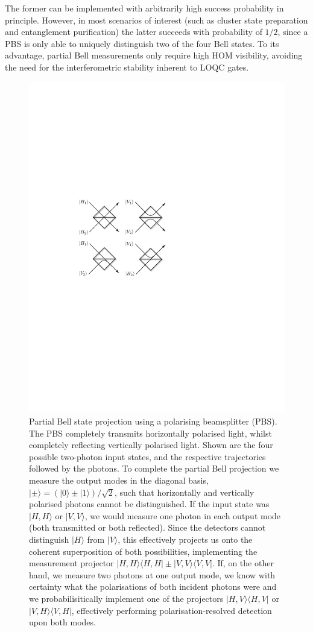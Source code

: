 \documentclass[aps,rmp,twocolumn,amsmath,amssymb,nofootinbib,superscriptaddress,longbibliography,floatfix]{revtex4-1}
\newcommand{\bra}[1]{\langle#1|}
\newcommand{\ket}[1]{|#1\rangle}
\begin{document}
The former can be implemented with arbitrarily high success probability in principle. However, in most scenarios of interest (such as cluster state preparation and entanglement purification) the latter succeeds with probability of $1/2$, since a PBS is only able to uniquely distinguish two of the four Bell states. To its advantage, partial Bell measurements only require high HOM visibility, avoiding the need for the interferometric stability inherent to LOQC gates.

\begin{figure}[!htb]
\includegraphics[width=0.75\columnwidth]{partial_bell}
\caption{Partial Bell state projection using a polarising beamsplitter (PBS). The PBS completely transmits horizontally polarised light, whilst completely reflecting vertically polarised light. Shown are the four possible two-photon input states, and the respective trajectories followed by the photons. To complete the partial Bell projection we measure the output modes in the diagonal basis, \mbox{$\ket{\pm} = (\ket{0}\pm\ket{1})/\sqrt{2}$}, such that horizontally and vertically polarised photons cannot be distinguished. If the input state was $\ket{H,H}$ or $\ket{V,V}$, we would measure one photon in each output mode (both transmitted or both reflected). Since the detectors cannot distinguish $\ket{H}$ from $\ket{V}$, this effectively projects us onto the coherent superposition of both possibilities, implementing the measurement projector \mbox{$\ket{H,H}\bra{H,H}\pm\ket{V,V}\bra{V,V}$}. If, on the other hand, we measure two photons at one output mode, we know with certainty what the polarisations of both incident photons were and we probabilisitically implement one of the projectors $\ket{H,V}\bra{H,V}$ or $\ket{V,H}\bra{V,H}$, effectively performing polarisation-resolved detection upon both modes.} \label{fig:partial_bell}
\end{figure}
\end{document}
